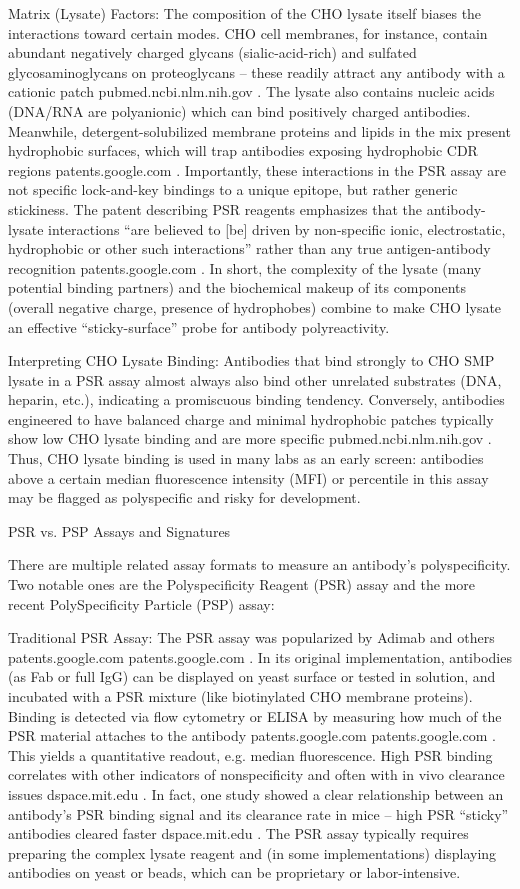 Matrix (Lysate) Factors: The composition of the CHO lysate itself biases the interactions toward certain modes. CHO cell membranes, for instance, contain abundant negatively charged glycans (sialic-acid-rich) and sulfated glycosaminoglycans on proteoglycans – these readily attract any antibody with a cationic patch
pubmed.ncbi.nlm.nih.gov
. The lysate also contains nucleic acids (DNA/RNA are polyanionic) which can bind positively charged antibodies. Meanwhile, detergent-solubilized membrane proteins and lipids in the mix present hydrophobic surfaces, which will trap antibodies exposing hydrophobic CDR regions
patents.google.com
. Importantly, these interactions in the PSR assay are not specific lock-and-key bindings to a unique epitope, but rather generic stickiness. The patent describing PSR reagents emphasizes that the antibody-lysate interactions “are believed to [be] driven by non-specific ionic, electrostatic, hydrophobic or other such interactions” rather than any true antigen-antibody recognition
patents.google.com
. In short, the complexity of the lysate (many potential binding partners) and the biochemical makeup of its components (overall negative charge, presence of hydrophobes) combine to make CHO lysate an effective “sticky-surface” probe for antibody polyreactivity.

Interpreting CHO Lysate Binding: Antibodies that bind strongly to CHO SMP lysate in a PSR assay almost always also bind other unrelated substrates (DNA, heparin, etc.), indicating a promiscuous binding tendency. Conversely, antibodies engineered to have balanced charge and minimal hydrophobic patches typically show low CHO lysate binding and are more specific
pubmed.ncbi.nlm.nih.gov
. Thus, CHO lysate binding is used in many labs as an early screen: antibodies above a certain median fluorescence intensity (MFI) or percentile in this assay may be flagged as polyspecific and risky for development.

PSR vs. PSP Assays and Signatures

There are multiple related assay formats to measure an antibody’s polyspecificity. Two notable ones are the Polyspecificity Reagent (PSR) assay and the more recent PolySpecificity Particle (PSP) assay:

Traditional PSR Assay: The PSR assay was popularized by Adimab and others
patents.google.com
patents.google.com
. In its original implementation, antibodies (as Fab or full IgG) can be displayed on yeast surface or tested in solution, and incubated with a PSR mixture (like biotinylated CHO membrane proteins). Binding is detected via flow cytometry or ELISA by measuring how much of the PSR material attaches to the antibody
patents.google.com
patents.google.com
. This yields a quantitative readout, e.g. median fluorescence. High PSR binding correlates with other indicators of nonspecificity and often with in vivo clearance issues
dspace.mit.edu
. In fact, one study showed a clear relationship between an antibody’s PSR binding signal and its clearance rate in mice – high PSR “sticky” antibodies cleared faster
dspace.mit.edu
. The PSR assay typically requires preparing the complex lysate reagent and (in some implementations) displaying antibodies on yeast or beads, which can be proprietary or labor-intensive.

